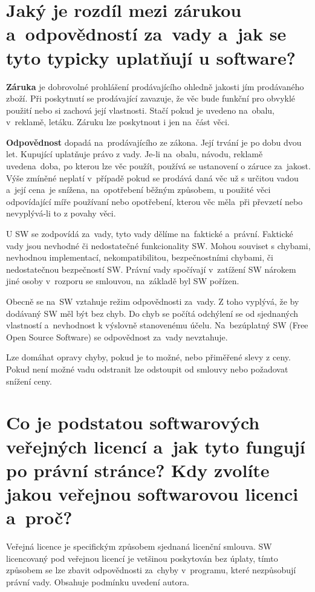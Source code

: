 \newpage
\section{Jaký je rozdíl mezi zárukou a~odpovědností za~vady a~jak se tyto typicky uplatňují u software?}

\textbf{Záruka} je dobrovolné prohlášení prodávajícího ohledně jakosti jím prodávaného zboží. Při poskytnutí se prodávající zavazuje, že věc bude funkční pro obvyklé použití nebo si zachová její vlastnosti. Stačí pokud je uvedeno na~obalu, v~reklamě, letáku. Záruku lze poskytnout i jen na~část věci.

\textbf{Odpovědnost} dopadá na~prodávajícího ze zákona. Její trvání je po dobu dvou let. Kupující uplatňuje právo z vady. Je-li na~obalu, návodu, reklamě uvedena~doba, po kterou lze věc použít, používá se ustanovení o záruce za~jakost. Výše zmíněné neplatí v~případě pokud se prodává daná věc už s určitou vadou a~její cena~je snížena, na~opotřebení běžným způsobem, u použité věci odpovídající míře používaní nebo opotřebení, kterou věc měla~při převzetí nebo nevyplývá-li to z povahy věci.

U SW se zodpovídá za~vady, tyto vady dělíme na~faktické a~právní. Faktické vady jsou nevhodné či nedostatečné funkcionality SW\@. Mohou souviset s chybami, nevhodnou implementací, nekompatibilitou, bezpečnostními chybami, či nedostatečnou bezpečností SW\@. Právní vady spočívají v~zatížení SW nárokem jiné osoby v~rozporu se smlouvou, na~základě byl SW pořízen. 

Obecně se na~SW vztahuje režim odpovědnosti za~vady. Z toho vyplývá, že by dodávaný SW měl být bez chyb. Do chyb se počítá odchýlení se od sjednaných vlastností a~nevhodnost k výslovně stanovenému účelu. Na~bezúplatný SW (Free Open Source Software) se odpovědnost za~vady nevztahuje.

Lze domáhat opravy chyby, pokud je to možné, nebo přiměřené slevy z ceny. Pokud není možné vadu odstranit lze odstoupit od smlouvy nebo požadovat snížení ceny.


\section{Co je podstatou softwarových veřejných licencí a~jak tyto fungují po právní stránce? Kdy zvolíte jakou veřejnou softwarovou licenci a~proč?}

Veřejná licence je specifickým způsobem sjednaná licenční smlouva. SW licencovaný pod veřejnou licencí je vetšinou poskytován bez úplaty, tímto způsobem se lze zbavit odpovědnosti za~chyby v~programu, které nezpůsobují právní vady. Obsahuje podmínku uvedení autora. 

